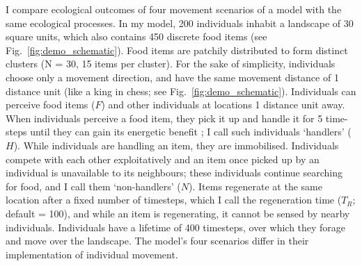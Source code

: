 \begin{interludeenv}
I compare ecological outcomes of four movement scenarios of a model with the same ecological processes.
In my model, 200 individuals inhabit a landscape of 30 square units, which also contains 450 discrete food items (see Fig.~\ref{fig:demo_schematic}).
Food items are patchily distributed to form distinct clusters (N = 30, 15 items per cluster).
For the sake of simplicity, individuals choose only a movement direction, and have the same movement distance of 1 distance unit (like a king in chess; see Fig.~\ref{fig:demo_schematic}).
Individuals can perceive food items ($F$) and other individuals at locations 1 distance unit away.
When individuals perceive a food item, they pick it up and handle it for 5 time-steps until they can gain its energetic benefit \citep{ruxton1992,gupte2021a,gupte2022c}; I call such individuals `handlers' ($H$).
While individuals are handling an item, they are immobilised.
Individuals compete with each other exploitatively and an item once picked up by an individual is unavailable to its neighbours; these individuals continue searching for food, and I call them `non-handlers' ($N$).
Items regenerate at the same location after a fixed number of timesteps, which I call the regeneration time ($T_R$; default = 100), and while an item is regenerating, it cannot be sensed by nearby individuals.
Individuals have a lifetime of 400 timesteps, over which they forage and move over the landscape.
The model's four scenarios differ in their implementation of individual movement.


\end{interludeenv}
